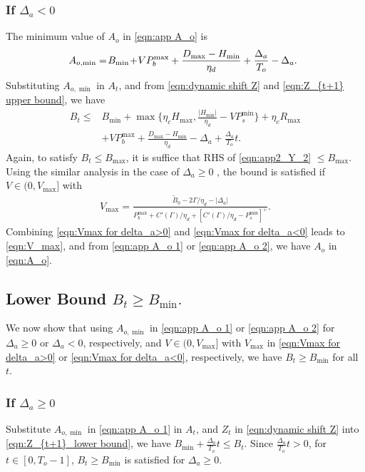 \documentclass[journal]{IEEEtran}
\def\nn{\nonumber}
\begin{document}
\subsubsection{If $\Delta_a<0$} The minimum value of $A_o$ in \eqref{eqn:app A_o} is \begin{align}\label{eqn:app A_o 2}
\hspace*{-.5em}A_{o,\min}=\!B_{\min}\!+\!VP_{b}^{\max}+\frac{D_{\max}-H_{\min}}{\eta_d}+\frac{\Delta_a}{T_o}-\Delta_a.
\end{align}
Substituting $A_{o,\min}$ in $A_t$, and  from \eqref{eqn:dynamic shift Z} and  \eqref{eqn:Z_{t+1} upper bound}, we have
\begin{align}\label{eqn:app2_Y_2}
B_t\leq& B_{\min}+\max\{\eta_cH_{\max},\frac{|H_{\min}|}{\eta_d}\!-VP_{s}^{\min}\}+\eta_cR_{\max}\nn\\
&+VP_{b}^{\max}+\frac{D_{\max}\!-\!H_{\min}}{\eta_d}-\Delta_a+\frac{\Delta_a}{T_o}t.
\end{align}
Again, to satisfy $B_t\le B_{\max}$, it is suffice that RHS of \eqref{eqn:app2_Y_2} $\le B_{\max}$. Using the similar analysis in the case of $\Delta_a\ge0$ , the bound  is satisfied if $V\in (0,V_{\max}]$ with
\begin{align}\label{eqn:Vmax for delta_a<0}
V_{\max}=\frac{\tilde{B}_0-2\Gamma/\eta_d-|\Delta_a|}{P_{b}^{\max}+C'(\Gamma)/\eta_d+[C'(\Gamma)/\eta_d-P_{s}^{\min}]^+}.
\end{align}
Combining \eqref{eqn:Vmax for delta_a>0} and \eqref{eqn:Vmax for delta_a<0} leads to  \eqref{eqn:V_max}, and from  \eqref{eqn:app A_o 1} or \eqref{eqn:app A_o 2}, we have $A_o$ in \eqref{eqn:A_o}.

\subsection{Lower Bound  $B_t\geq B_{\min}.$}
We now show that using $A_{o,\min}$ in \eqref{eqn:app A_o 1} or \eqref{eqn:app A_o 2} for $\Delta_a\ge 0$ or $\Delta_a<0$, respectively, and $V\in (0,V_{\max}]$ with $V_{\max}$ in \eqref{eqn:Vmax for delta_a>0} or \eqref{eqn:Vmax for delta_a<0}, respectively, we have $B_t\ge B_{\min}$ for all $t$.
\setcounter{subsubsection}{0}
\subsubsection{If $\Delta_a\geq0$} Substitute $A_{o,\min}$ in \eqref{eqn:app A_o 1} in $A_t$, and $Z_t$ in \eqref{eqn:dynamic shift Z} into \eqref{eqn:Z_{t+1}_lower bound}, we have
 $B_{\min}+\frac{\Delta_a}{T_o}t\leq B_t$. Since $\frac{\Delta_a}{T_o}t>0$, for $t\in [0,T_o-1]$, $B_t\geq B_{\min}$ is satisfied for $\Delta_a\geq0$.
\end{document}
